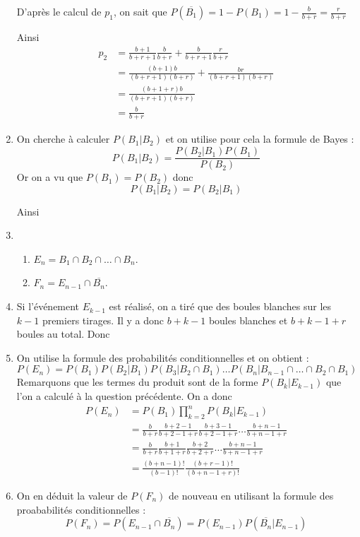 \documentclass[a4paper, 11pt,reqno]{article}
\begin{document}
\begin{exercice}
\begin{correction}
\begin{enumerate}
D'après le calcul de $p_1$, on sait que $P(\overline{B_1})= 1-P(B_1) =1-\frac{b}{b+r}= \frac{r}{b+r}$

Ainsi 
\begin{align*}
p_2&=\frac{b+1}{b+r+1} \frac{b}{b+r} + \frac{b}{b+r+1} \frac{r}{b+r}\\
	&=\frac{(b+1)b}{(b+r+1)(b+r)} + \frac{br}{(b+r+1)(b+r)} \\
	&=\frac{(b+1+r)b}{(b+r+1)(b+r)}  \\
	&=\frac{b}{b+r}  
\end{align*}


\item On cherche à calculer $P(B_1|B_2)$ et on utilise pour cela la formule de Bayes :
$$P(B_1|B_2) =\frac{P(B_2|B_1) P(B_1)}{P(B_2)}$$
Or on a vu que $P(B_1) =P(B_2)$ donc 
$$P(B_1|B_2) =P(B_2|B_1)$$

Ainsi 
\item \begin{enumerate}
\item $E_n = B_1 \cap B_2 \cap \dots \cap B_{n} $. 
\item $F_n =E_{n-1} \cap \overline{B_n}$. 
\end{enumerate}
\item Si l'événement $E_{k-1} $ est réalisé, on a tiré que des boules blanches sur les $k-1$ premiers tirages. Il y a donc $b+k-1$ boules blanches et $b+k-1+r$ boules au total. 
Donc  

\item On utilise la formule des probabilités conditionnelles et on obtient : 
$$P(E_n) = P(B_1) P(B_2|B_1) P(B_3|B_2\cap B_1) \dots  P(B_{n}|B_{n-1}\cap \dots \cap B_2\cap B_1) $$
Remarquons que les termes du produit sont de la forme $P(B_k |E_{k-1})$ que l'on a calculé à la question précédente. On a donc 
\begin{align*}
P(E_n) &=P(B_1) \prod_{k=2}^{n} P(B_k |E_{k-1})\\
			&=\frac{b}{b+r}\frac{b+2-1}{b+2-1+r} \frac{b+3-1}{b+2-1+r}\dots \frac{b+n-1}{b+n-1+r}\\
			&=\frac{b}{b+r}\frac{b+1}{b+1+r} \frac{b+2}{b+2+r}  \dots \frac{b+n-1}{b+n-1+r}\\
			&= \frac{(b+n-1)!}{(b-1)!} \frac{(b+r-1)!}{(b+n-1+r)!} 
\end{align*}


\item On en déduit la valeur de $P(F_n) $ de nouveau en utilisant la formule des proababilités conditionnelles : 
$$P(F_n) =P(E_{n-1}\cap \overline{B_n}) =P(E_{n-1} ) P(\overline{B_n}|E_{n-1})$$


\end{enumerate}
\end{correction}
\end{exercice}
\end{document}
